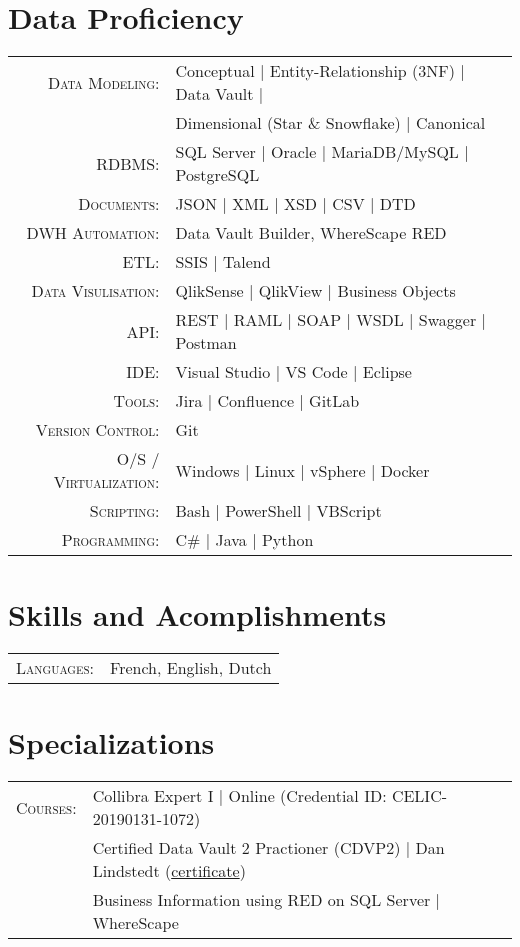 \documentclass[a4paper,10pt]{article}
\begin{document}
\section{Data Proficiency}
\begin{tabular}{rl}
  \textsc{Data Modeling:}& Conceptual | Entity-Relationship (3NF) | Data Vault | \\
  &Dimensional (Star \& Snowflake) | Canonical \\
  \textsc{RDBMS:}& SQL Server | Oracle | MariaDB/MySQL | PostgreSQL \\
  \textsc{Documents:}& JSON | XML | XSD | CSV | DTD \\
  \textsc{DWH Automation:}& Data Vault Builder, WhereScape RED \\
  \textsc{ETL:}& SSIS | Talend\\
  \textsc{Data Visulisation:}& QlikSense | QlikView | Business Objects \\
  \textsc{API:}& REST | RAML | SOAP | WSDL | Swagger | Postman\\
  \textsc{IDE:}& Visual Studio | VS Code | Eclipse\\
  \textsc{Tools:}& Jira | Confluence | GitLab\\
  \textsc{Version Control:}& Git \\
  \textsc{O/S / Virtualization:}& Windows | Linux | vSphere | Docker\\
  \textsc{Scripting}:&Bash | PowerShell | VBScript \\
  \textsc{Programming}:&C\# | Java | Python\\
\end{tabular}

\section{Skills and Acomplishments}
\begin{tabular}{rl}
  \textsc{Languages:}& French, English, Dutch\\
\end{tabular}

\section{Specializations}
\begin{tabular}{rl}
  \textsc{Courses:}
  &Collibra Expert I | Online (Credential ID: CELIC-20190131-1072)\\
  &Certified Data Vault 2 Practioner (CDVP2) | Dan Lindstedt (\href{http://keyldv.com/}{certificate})\\
  &Business Information using RED on SQL Server | WhereScape
\end{tabular}
\end{document}
